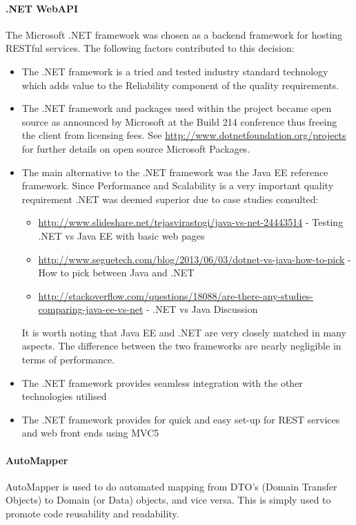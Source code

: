 \documentclass[11pt,a4paper,titlepage]{article}
\begin{document}
			\paragraph{.NET WebAPI}
				The Microsoft .NET framework was chosen as a backend framework for hosting RESTful services. The following factors contributed to this decision:
				\begin{itemize}
					\item The .NET framework is a tried and tested industry standard technology which adds value to the Reliability component of the 
							quality requirements.
					\item The .NET framework and packages used within the project became open source as announced by Microsoft at the Build 214 conference thus freeing the client from licensing fees. See \url{http://www.dotnetfoundation.org/projects} for further details on open source Microsoft Packages.
					\item The main alternative to the .NET framework was the Java EE reference framework. Since Performance and Scalability is a very important quality requirement .NET was deemed superior due to case studies consulted:
							\begin{itemize}
								\item  \url{http://www.slideshare.net/tejasvirastogi/java-vs-net-24443514} - Testing .NET vs Java EE with basic web pages
								\item  \url{http://www.seguetech.com/blog/2013/06/03/dotnet-vs-java-how-to-pick} - How to pick between Java and .NET
								\item  \url{http://stackoverflow.com/questions/18088/are-there-any-studies-comparing-java-ee-vs-net} - .NET vs Java Discussion
							\end{itemize}
							It is worth noting that Java EE and .NET are very closely matched in many aspects. The difference between the two frameworks are nearly negligible in terms of performance.
					\item The .NET framework provides seamless integration with the other technologies utilised
					\item The .NET framework provides for quick and easy set-up for REST services and web front ends using MVC5		
				\end{itemize}
			\paragraph{AutoMapper}
				AutoMapper is used to do automated mapping from DTO's (Domain Transfer Objects) to Domain (or Data) objects, and vice versa. This is simply used to promote code reusability and readability.
\end{document}
